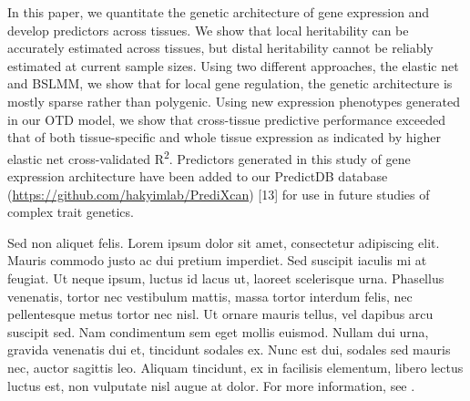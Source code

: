 \documentclass[10pt,letterpaper]{article}
\begin{document}
%

In this paper, we quantitate the genetic architecture of gene expression
and develop predictors across tissues. We show that local heritability
can be accurately estimated across tissues, but distal heritability
cannot be reliably estimated at current sample sizes. Using two
different approaches, the elastic net and BSLMM, we show that for local
gene regulation, the genetic architecture is mostly sparse rather than
polygenic. Using new expression phenotypes generated in our OTD model,
we show that cross-tissue predictive performance exceeded that of both
tissue-specific and whole tissue expression as indicated by higher
elastic net cross-validated R\textsuperscript{2}. Predictors generated
in this study of gene expression architecture have been added to our
PredictDB database (\url{https://github.com/hakyimlab/PrediXcan})
{[}13{]} for use in future studies of complex trait genetics.


Sed non aliquet felis. Lorem ipsum dolor sit amet, consectetur adipiscing elit. Mauris commodo justo ac dui pretium imperdiet. Sed suscipit iaculis mi at feugiat. Ut neque ipsum, luctus id lacus ut, laoreet scelerisque urna. Phasellus venenatis, tortor nec vestibulum mattis, massa tortor interdum felis, nec pellentesque metus tortor nec nisl. Ut ornare mauris tellus, vel dapibus arcu suscipit sed. Nam condimentum sem eget mollis euismod. Nullam dui urna, gravida venenatis dui et, tincidunt sodales ex. Nunc est dui, sodales sed mauris nec, auctor sagittis leo. Aliquam tincidunt, ex in facilisis elementum, libero lectus luctus est, non vulputate nisl augue at dolor. For more information, see .
\end{document}

